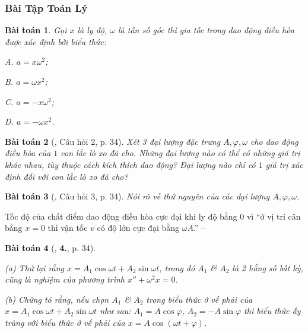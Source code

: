 \documentclass{article}
\numberwithin{equation}{section}
\newtheorem{baitoan}{Bài toán}[section]
\begin{document}

\subsubsection{Bài Tập Toán Lý}

\begin{baitoan}
	Gọi $x$ là ly độ, $\omega$ là tần số góc thì gia tốc trong dao động điều hòa được xác định bởi biểu thức:
	\begin{enumerate*}
		\item[{\rm\sf A.}] $a = x\omega^2$;
		\item[{\rm\sf B.}] $a = \omega x^2$;
		\item[{\rm\sf C.}] $a = -x\omega^2$;
		\item[{\rm\sf D.}] $a = -\omega x^2$.
	\end{enumerate*}
\end{baitoan}

\begin{baitoan}[\cite{SGK_Vat_Ly_12_nang_cao}, Câu hỏi 2, p. 34]
	Xét 3 đại lượng đặc trưng $A,\varphi,\omega$ cho dao động điều hòa của $1$ con lắc lò xo đã cho. Những đại lượng nào có thể có những giá trị khác nhau, tùy thuộc cách kích thích dao động? Đại lượng nào chỉ có $1$ giá trị xác định đối với con lắc lò xo đã cho?
\end{baitoan}

\begin{baitoan}[\cite{SGK_Vat_Ly_12_nang_cao}, Câu hỏi 3, p. 34]
	Nói rõ về thứ nguyên của các đại lượng $A,\varphi,\omega$.
\end{baitoan}
Tốc độ của chất điểm dao động điều hòa cực đại khi ly độ bằng $0$ vì ``ở vị trí cân bằng $x = 0$ thì vận tốc $v$ có độ lớn cực đại bằng $\omega A$.'' -- \cite[p. 32]{SGK_Vat_Ly_12_nang_cao}

\begin{baitoan}[\cite{SGK_Vat_Ly_12_nang_cao}, \textbf{4.}, p. 34]
	\begin{enumerate*}
		\item[(a)] Thử lại rằng $x = A_1\cos\omega t + A_2\sin\omega t$, trong đó $A_1$ \& $A_2$ là 2 hằng số bất kỳ, cũng là nghiệm của phương trình $x'' + \omega^2x = 0$.
		\item[(b)] Chứng tỏ rằng, nếu chọn $A_1$ \& $A_2$ trong biểu thức ở vế phải của $x = A_1\cos\omega t + A_2\sin\omega t$ như sau: $A_1 = A\cos\varphi$, $A_2 = -A\sin\varphi$ thì biểu thức ấy trùng với biểu thức ở vế phải của $x = A\cos(\omega t + \varphi)$.
	\end{enumerate*}
\end{baitoan}
\end{document}
